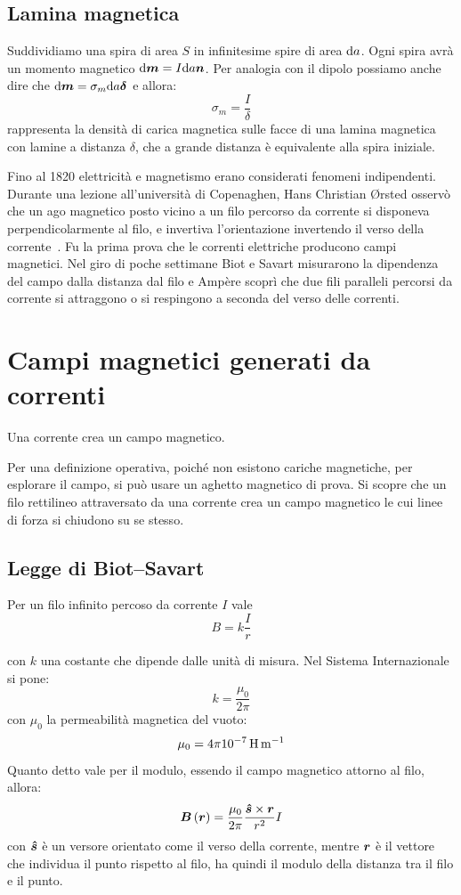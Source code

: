 \subsection{Lamina magnetica}
Suddividiamo una spira di area $S$ in infinitesime spire di area $\mathrm{d} a$. Ogni spira avrà un momento magnetico $\mathrm{d}\boldsymbol{m}=I\mathrm{d} a\boldsymbol{n}$. Per analogia con il dipolo possiamo anche dire che $\mathrm{d}\boldsymbol{m}=\sigma_m\mathrm{d} a \boldsymbol{\delta}$ e allora:
\[\sigma_m=\frac{I}{\delta}\]
rappresenta la densità di carica magnetica sulle facce di una lamina magnetica con lamine a distanza $\delta$, che a grande distanza è equivalente alla spira iniziale.

\begin{Es}
  Fino al 1820 elettricità e magnetismo erano considerati fenomeni indipendenti. Durante una lezione all'università di Copenaghen, Hans Christian Ørsted osservò che un ago magnetico posto vicino a un filo percorso da corrente si disponeva perpendicolarmente al filo, e invertiva l'orientazione invertendo il verso della corrente~\cite{oersted1820}. Fu la prima prova che le correnti elettriche producono campi magnetici. Nel giro di poche settimane Biot e Savart misurarono la dipendenza del campo dalla distanza dal filo e Ampère scoprì che due fili paralleli percorsi da corrente si attraggono o si respingono a seconda del verso delle correnti.
\end{Es}

\section{Campi magnetici generati da correnti}
Una corrente crea un campo magnetico.

Per una definizione operativa, poiché non esistono cariche magnetiche, per esplorare il campo, si può usare un aghetto magnetico di prova. Si scopre che un filo rettilineo attraversato da una corrente crea un campo magnetico le cui linee di forza si chiudono su se stesso.
\subsection{Legge di Biot--Savart}
\begin{legge}
  Per un filo infinito percoso da corrente $I$ vale
  \begin{equation}
    B=k\frac{I}{r}
  \end{equation}
\end{legge}
con $k$ una costante che dipende dalle unità di misura. Nel Sistema Internazionale si pone:
\[k=\frac{\mu_0}{2\pi}\]
con $\mu_0$ la permeabilità magnetica del vuoto:
\[
  \mu_0=\SI[parse-numbers = false]{4\pi 10^{-7}}{\henry\per\meter}
\]
Quanto detto vale per il modulo, essendo il campo magnetico attorno al filo, allora:
\[\boldsymbol{B}\left(\boldsymbol{r}\right)=\frac{\mu_0}{2\pi}\frac{\boldsymbol{\hat {s}}\times\boldsymbol{r}}{r^2}I\]
con $\boldsymbol{\hat {s}}$ è un versore orientato come il verso della corrente, mentre $\boldsymbol{r}$ è il vettore che individua il punto rispetto al filo, ha quindi il modulo della distanza tra il filo e il punto.
